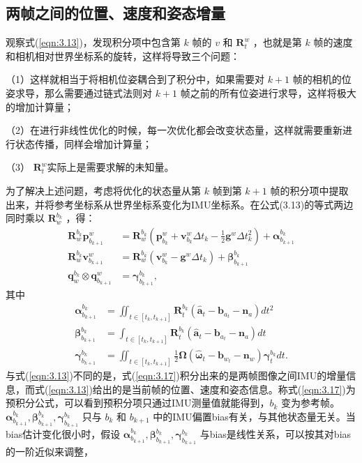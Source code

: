 \subsection{两帧之间的位置、速度和姿态增量}
观察式(\ref{eqn:3.13})，发现积分项中包含第 $k$  帧的 $v$ 和 $\mathbf{R}_t^w $ ，也就是第 $k$ 帧的速度和相机相对世界坐标系的旋转，这样将导致三个问题：

（1）这样就相当于将相机位姿耦合到了积分中，如果需要对 $k+1$ 帧的相机的位姿求导，那么需要通过链式法则对 $k+1$ 帧之前的所有位姿进行求导，这样将极大的增加计算量；

（2）在进行非线性优化的时候，每一次优化都会改变状态量，这样就需要重新进行状态传播，同样会增加计算量；

（3） $\mathbf{R}_t^w $实际上是需要求解的未知量。

为了解决上述问题，考虑将优化的状态量从第 $k$ 帧到第 $k+1$ 帧的积分项中提取出来，并将参考坐标系从世界坐标系变化为IMU坐标系。在公式(3.13)的等式两边同时乘以 $\mathbf{R}_w^{b_k} $ ，得：
\begin{equation}
\label{eqn:3.16}
\begin{split}
\mathbf{R}_w^{b_k}\mathbf{p}_{b_{k+1}}^w&=\mathbf{R}_w^{b_k}(\mathbf{p}_{b_k}^w+\mathbf{v}_{b_k}^w\Delta t_k -\frac{1}{2}\mathbf{g}^w\Delta {t_k^2})+\bm{\alpha}_{b_{k+1}}^{b_k} \\
\mathbf{R}_w^{b_k}\mathbf{v}_{b_{k+1}}^w&=\mathbf{R}_w^{b_k}(\mathbf{v}_{b_k}^w-\mathbf{g}^w\Delta t_k)+\bm{\beta}_{b_{k+1}}^{b_k} \\
\mathbf{q}_w^{b_k}\otimes\mathbf{q}_{b_{k+1}}^w&=\bm{\gamma}_{b_{k+1}}^{b_k},
\end{split}
\end{equation}
其中
\begin{equation}
\label{eqn:3.17}
\begin{split}
\bm{\alpha}_{b_{k+1}}^{b_k}&=\iint_{t\in[t_k,t_{k+1}]}\mathbf{R}_t^{b_k}(\hat{\mathbf{a}}_t-\mathbf{b}_{a_t}-\mathbf{n}_a)dt^2 \\
\bm{\beta}_{b_{k+1}}^{b_k}&=\int_{t\in[t_k,t_{k+1}]}\mathbf{R}_t^{b_k}(\hat{\mathbf{a}}_t-\mathbf{b}_{a_t}-\mathbf{n}_a)dt \\
\bm{\gamma}_{b_{k+1}}^{b_k}&=\iint_{t\in[t_k,t_{k+1}]}\frac{1}{2}\bm{\Omega}(\hat{\bm{\omega}}_t-\mathbf{b}_{w_t}-\mathbf{n}_w)\bm{\gamma}_{t}^{b_k}dt.
\end{split}
\end{equation}
与式(\ref{eqn:3.13})不同的是，式(\ref{eqn:3.17})积分出来的是两帧图像之间IMU的增量信息，而式(\ref{eqn:3.13})给出的是当前帧的位置、速度和姿态信息。称式(\ref{eqn:3.17})为预积分公式，可以看到预积分项只通过IMU测量值就能得到，$b_k $ 变为参考帧。$\bm{\alpha}_{b_{k+1}}^{b_k},\bm{\beta}_{b_{k+1}}^{b_k}, \bm{\gamma}_{b_{k+1}}^{b_k}  $ 只与 $b_{k} $ 和 $b_{k+1} $ 中的IMU偏置bias有关，与其他状态量无关。当bias估计变化很小时，假设 $\bm{\alpha}_{b_{k+1}}^{b_k},\bm{\beta}_{b_{k+1}}^{b_k}, \bm{\gamma}_{b_{k+1}}^{b_k}  $ 与bias是线性关系，可以按其对bias的一阶近似来调整，
